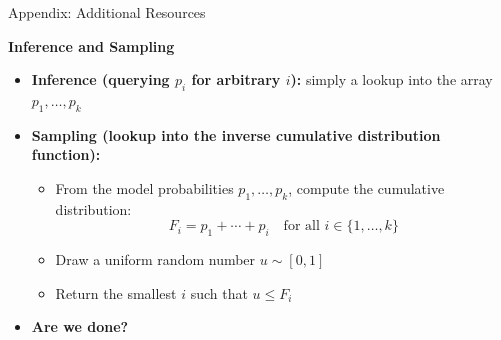 \begin{frame}[allowframebreaks]{Appendix: Additional Resources}
\framebreak

\large
\textbf{Inference and Sampling}
\normalsize
\begin{itemize}
    \setlength{\itemsep}{0.75em}
    \item \textbf{Inference (querying $p_i$ for arbitrary $i$):} simply a lookup into the array $p_1, \ldots, p_k$
    \item \textbf{Sampling (lookup into the inverse cumulative distribution function):}
    \begin{itemize}
        \item From the model probabilities $p_1, \ldots, p_k$, compute the cumulative distribution:
        \[
            F_i = p_1 + \cdots + p_i \quad \text{for all } i \in \{1, \ldots, k\}
        \]
        \item Draw a uniform random number $u \sim [0, 1]$
        \item Return the smallest $i$ such that $u \leq F_i$
    \end{itemize}
    \item \textbf{Are we done?}
\end{itemize}

\framebreak


\end{frame}
